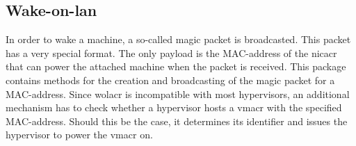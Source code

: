 
\subsection{Wake-on-lan}
In order to wake a machine, a so-called magic packet is broadcasted. This packet has a very special format. The only  payload is the MAC-address of the \gls{nicacr} that can power the attached machine when the packet is received.
\newline
This package contains methods for the creation and broadcasting of the magic packet for a MAC-address. Since \gls{wolacr} is incompatible with most hypervisors, an additional mechanism has to check whether a hypervisor hosts a \gls{vmacr} with the specified MAC-address. Should this be the case, it determines its identifier and issues the hypervisor to power the \gls{vmacr} on.

